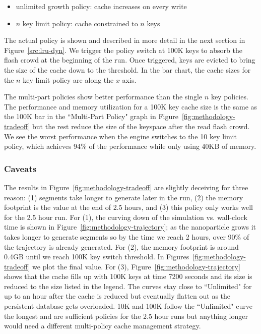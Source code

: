 \begin{itemize}
  \item unlimited growth policy: cache increases on every write
  \item \(n\) key limit policy: cache constrained to \(n\) keys
\end{itemize}

The actual policy is shown and described in more detail in the next section in
Figure~\ref{src:lru-dyn}.  We trigger the policy switch at 100K keys to absorb
the flash crowd at the beginning of the run. Once triggered, keys are evicted
to bring the size of the cache down to the threshold.  In the bar chart, the
cache sizes for the \(n\) key limit policy are along the \(x\) axis.

The multi-part policies show better performance than the single \(n\) key
policies. The performance and memory utilization for a 100K key cache size is
the same as the 100K bar in the ``Multi-Part Policy" graph in  Figure~\ref{fig:methodology-tradeoff} but
the rest reduce the size of the keyspace after the read flash crowd.  We see
the worst performance when the engine switches to the 10 key limit policy,
which achieves 94\% of the performance while only using 40KB of memory. 

\subsubsection*{Caveats}

The results in Figure~\ref{fig:methodology-tradeoff} are slightly deceiving for
three reason: (1) segments take longer to generate later in the run, (2) the
memory footprint is the value at the end of 2.5 hours, and (3) this policy only
works well for the 2.5 hour run.  For (1), the curving down of the simulation
vs. wall-clock time is shown in Figure~\ref{fig:methodology-trajectory}; as the
nanoparticle grows it takes longer to generate segments so by the time we reach
2 hours, over 90\% of the trajectory is already generated.  For (2), the memory
footprint is around 0.4GB until we reach 100K key switch threshold. In
Figures~\ref{fig:methodology-tradeoff} we plot the final value. For (3),
Figure~\ref{fig:methodology-trajectory} shows that the cache fills up with 100K
keys at time 7200 seconds and its size is reduced to the size listed in the
legend.  The curves stay close to ``Unlimited" for up to an hour after the
cache is reduced but eventually flatten out as the persistent database gets
overloaded. 10K and 100K follow the ``Unlimited" curve the longest and are
sufficient policies for the 2.5 hour runs but anything longer would need a
different multi-policy cache management strategy.

